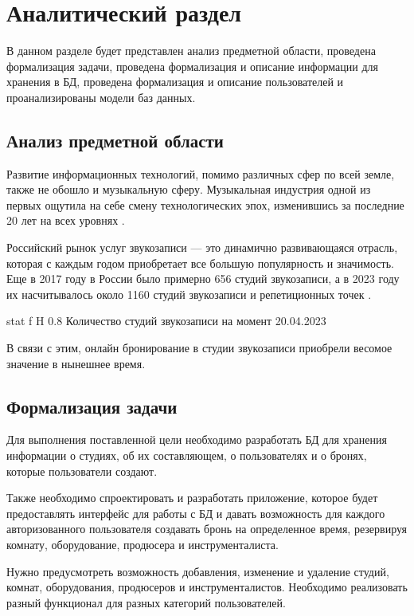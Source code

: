 
\chapter{Аналитический раздел}
В данном разделе будет представлен анализ предметной области, проведена формализация задачи, проведена формализация и описание информации для хранения в БД, проведена формализация и описание пользователей и проанализированы модели баз данных. 
\section{Анализ предметной области}
Развитие информационных технологий, помимо различных сфер по всей земле, также не обошло и музыкальную сферу.
Музыкальная индустрия одной из первых ощутила на себе смену технологических эпох, изменившись за последние 20 лет на всех уровнях \cite{music_and_it}.

Российский рынок услуг звукозаписи --- это динамично развивающаяся отрасль, которая с каждым годом приобретает все большую популярность и значимость.
Еще в 2017 году в России было примерно 656 студий звукозаписи, а в 2023 году их насчитывалось около 1160 студий звукозаписи и репетиционных точек \cite{music_stat}.

{stat} %
{f} %
{H} %
{0.8\textwidth} %
{Количество студий звукозаписи на момент 20.04.2023 \cite{music_stat}} %



В связи с этим, онлайн бронирование в студии звукозаписи приобрели весомое значение в нынешнее время.

\section{Формализация задачи}
Для выполнения поставленной цели необходимо разработать БД для хранения информации о студиях, об их составляющем, о пользователях и о бронях, которые пользователи создают.

Также необходимо спроектировать и разработать приложение, которое будет предоставлять интерфейс для работы с БД и давать возможность для каждого авторизованного пользователя создавать бронь на определенное время, резервируя комнату, оборудование, продюсера и инструменталиста.

Нужно предусмотреть возможность добавления, изменение и удаление студий, комнат, оборудования, продюсеров и инструменталистов.
Необходимо реализовать разный функционал для разных категорий пользователей.

